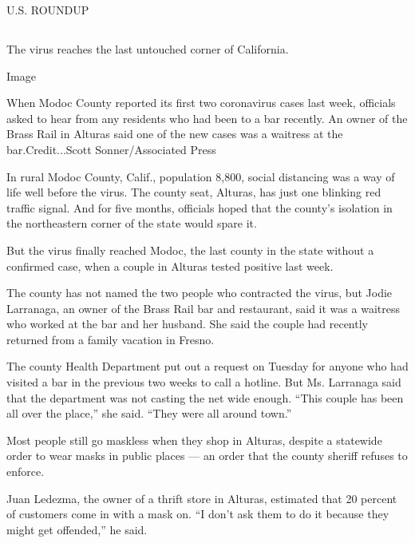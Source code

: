 U.S. ROUNDUP

\hypertarget{-8}{%
\subsection{}\label{-8}}

The virus reaches the last untouched corner of California.

Image

When Modoc County reported its first two coronavirus cases last week,
officials asked to hear from any residents who had been to a bar
recently. An owner of the Brass Rail in Alturas said one of the new
cases was a waitress at the bar.Credit...Scott Sonner/Associated Press

In rural Modoc County, Calif., population 8,800, social distancing was a
way of life well before the virus. The county seat, Alturas, has just
one blinking red traffic signal. And for five months, officials hoped
that the county's isolation in the northeastern corner of the state
would spare it.

But the virus finally reached Modoc, the last county in the state
without a confirmed case, when a couple in Alturas tested positive last
week.

The county has not named the two people who contracted the virus, but
Jodie Larranaga, an owner of the Brass Rail bar and restaurant, said it
was a waitress who worked at the bar and her husband. She said the
couple had recently returned from a family vacation in Fresno.

The county Health Department put out a request on Tuesday for anyone who
had visited a bar in the previous two weeks to call a hotline. But Ms.
Larranaga said that the department was not casting the net wide enough.
``This couple has been all over the place,'' she said. ``They were all
around town.''

Most people still go maskless when they shop in Alturas, despite a
statewide order to wear masks in public places --- an order that the
county sheriff refuses to enforce.

Juan Ledezma, the owner of a thrift store in Alturas, estimated that 20
percent of customers come in with a mask on. ``I don't ask them to do it
because they might get offended,'' he said.

\hypertarget{-9}{%
\subsection{}\label{-9}}

